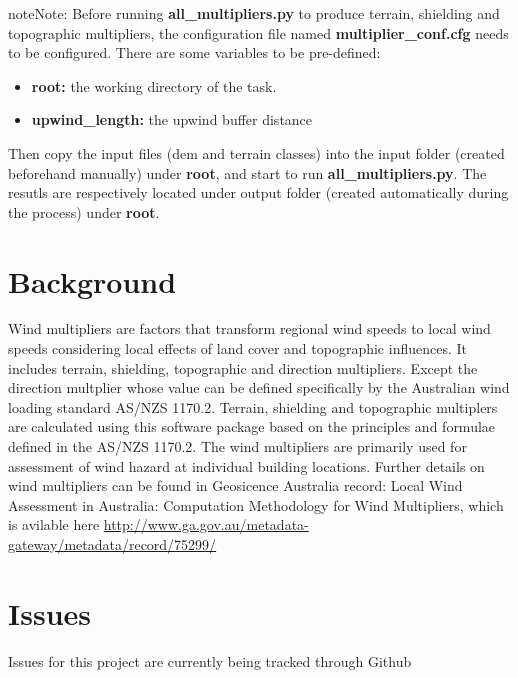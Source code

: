 \documentclass[letterpaper,10pt,english]{sphinxmanual}
\begin{document}
\begin{notice}{note}{Note:}
Before running \textbf{all\_multipliers.py} to produce terrain, shielding and topographic multipliers, the configuration file named \textbf{multiplier\_conf.cfg} needs to be configured. There are some variables to be pre-defined:
\begin{itemize}
\item {} 
\textbf{root:} the working directory of the task.

\item {} 
\textbf{upwind\_length:} the upwind buffer distance

\end{itemize}

Then copy the input files (dem and terrain classes) into the input folder (created beforehand manually) under \textbf{root}, and start to run \textbf{all\_multipliers.py}. The resutls are respectively located under output folder (created automatically during the process) under \textbf{root}.
\end{notice}


\chapter{Background}
\label{index:background}
Wind multipliers are factors that transform regional wind speeds to local wind speeds considering local effects of land cover and topographic influences.
It includes terrain, shielding, topographic and direction multipliers. Except the direction multplier whose value can be defined specifically by the
Australian wind loading standard AS/NZS 1170.2. Terrain, shielding and topographic multiplers are calculated using this software package based on the
principles and formulae defined in the AS/NZS 1170.2. The wind multipliers are primarily used for assessment of wind hazard at individual building locations.
Further details on wind multipliers can be found in Geosicence Australia record: Local Wind Assessment in Australia: Computation Methodology for Wind Multipliers,
which is avilable here \href{http://www.ga.gov.au/metadata-gateway/metadata/record/75299/}{http://www.ga.gov.au/metadata-gateway/metadata/record/75299/}


\chapter{Issues}
\label{index:issues}
Issues for this project are currently being tracked through Github
\end{document}
